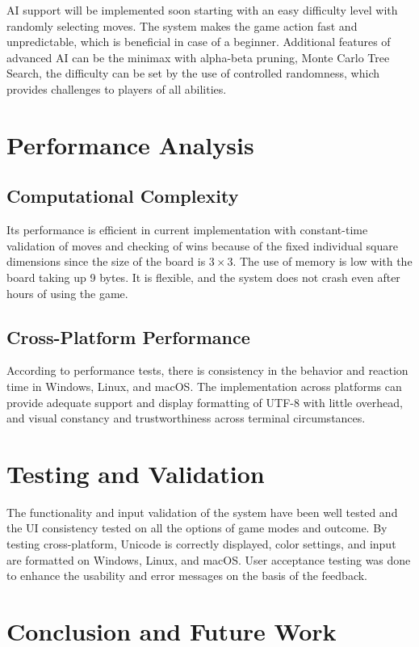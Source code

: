\documentclass[11pt,a4paper,twocolumn]{article}
\begin{document}
AI support will be implemented soon starting with an easy difficulty level with randomly selecting moves. The system makes the game action fast and unpredictable, which is beneficial in case of a beginner. Additional features of advanced AI can be the minimax with alpha-beta pruning, Monte Carlo Tree Search, the difficulty can be set by the use of controlled randomness, which provides challenges to players of all abilities.

\section{Performance Analysis}

\subsection{Computational Complexity}

Its performance is efficient in current implementation with constant-time validation of moves and checking of wins because of the fixed individual square dimensions since the size of the board is $3 \times 3$. The use of memory is low with the board taking up 9 bytes. It is flexible, and the system does not crash even after hours of using the game.

\subsection{Cross-Platform Performance}

According to performance tests, there is consistency in the behavior and reaction time in Windows, Linux, and macOS. The implementation across platforms can provide adequate support and display formatting of UTF-8 with little overhead, and visual constancy and trustworthiness across terminal circumstances.

\section{Testing and Validation}

The functionality and input validation of the system have been well tested and the UI consistency tested on all the options of game modes and outcome. By testing cross-platform, Unicode is correctly displayed, color settings, and input are formatted on Windows, Linux, and macOS. User acceptance testing was done to enhance the usability and error messages on the basis of the feedback.

\section{Conclusion and Future Work}
\end{document}
